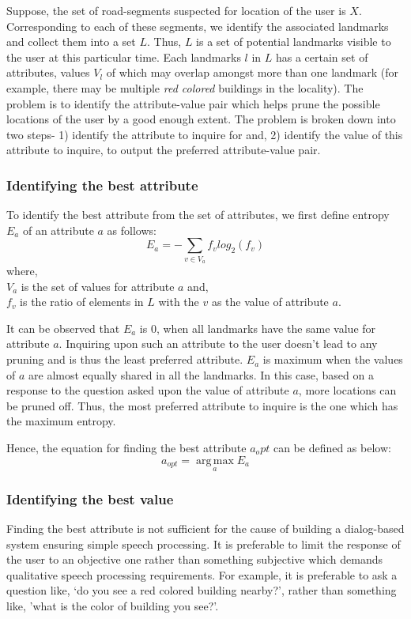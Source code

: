 \documentclass{iitkthesis}
\begin{document}
Suppose, the set of road-segments suspected for location of the user is $X$. Corresponding to each of these segments, we identify the associated landmarks and collect them into a set $L$. Thus, $L$ is a set of potential landmarks visible to the user at this particular time. Each landmarks $l$ in $L$ has a certain set of attributes, values $V_{l}$ of which may overlap amongst more than one landmark (for example, there may be multiple \textit{red colored} buildings in the locality). The problem is to identify the attribute-value pair which helps prune the possible locations of the user by a good enough extent. The problem is broken down into two steps- 1) identify the attribute to inquire for and, 2) identify the value of this attribute to inquire, to output the preferred attribute-value pair. 

\subsubsection*{Identifying the best attribute}
 To identify the best attribute from the set of attributes, we first define entropy $E_a$ of an attribute $a$ as follows:
\[\displaystyle E_{a} = - \sum_{v \in V_{a}}f_vlog_{2}{(f_v)}\] 
where, \\
$V_{a}$ is the set of values for attribute $a$ and, \\
$f_{v}$ is the ratio of elements in $L$ with the $v$ as the value of attribute $a$.

It can be observed that $E_a$ is 0, when all landmarks have the same value for attribute $a$. Inquiring upon such an attribute to the user doesn't lead to any pruning and is thus the least preferred attribute. $E_a$ is maximum when the values of $a$ are almost equally shared in all the landmarks. In this case, based on a response to the question asked upon the value of attribute $a$, more locations can be pruned off. Thus, the most preferred attribute to inquire is the one which has the maximum entropy.

Hence, the equation for finding the best attribute $a_opt$ can be defined as below:
\[\displaystyle a_{opt} = \operatorname*{arg\,max}_a E_a\] 

\subsubsection*{Identifying the best value}
Finding the best attribute is not sufficient for the cause of building a dialog-based system ensuring simple speech processing. It is preferable to limit the response of the user to an objective one rather than something subjective which demands qualitative speech processing requirements. For example, it is preferable to ask a question like, `do you see a red colored building nearby?', rather than something like, 'what is the color of building you see?'.
\end{document}
